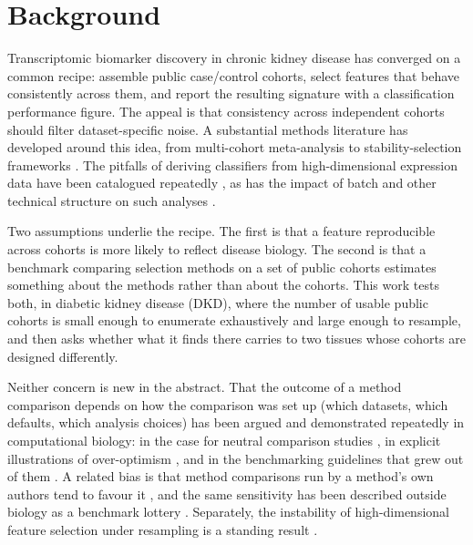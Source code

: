 \documentclass[pdflatex,sn-vancouver-num]{sn-jnl}
\theoremstyle{thmstyleone}
\theoremstyle{thmstyletwo}
\theoremstyle{thmstylethree}
\begin{document}

\maketitle

\section{Background}\label{sec:background}

Transcriptomic biomarker discovery in chronic kidney disease has converged on a common recipe:
assemble public case/control cohorts, select features that behave consistently across them, and
report the resulting signature with a classification performance figure. The appeal is that
consistency across independent cohorts should filter dataset-specific noise. A substantial
methods literature has developed around this idea, from multi-cohort meta-analysis
\cite{haynes2017} to stability-selection frameworks \cite{meinshausen2010}. The pitfalls of
deriving classifiers from high-dimensional expression data have been catalogued repeatedly
\cite{simon2003,whalen2022,diazuriarte2022}, as has the impact of batch and other technical
structure on such analyses \cite{leek2010}.

Two assumptions underlie the recipe. The first is that a feature reproducible across cohorts is
more likely to reflect disease biology. The second is that a benchmark comparing selection
methods on a set of public cohorts estimates something about the methods rather than about the
cohorts. This work tests both, in diabetic kidney disease (DKD), where the number of usable
public cohorts is small enough to enumerate exhaustively and large enough to resample, and
then asks whether what it finds there carries to two tissues whose cohorts are designed
differently.

Neither concern is new in the abstract. That the outcome of a method comparison depends on how
the comparison was set up (which datasets, which defaults, which analysis choices) has been
argued and demonstrated repeatedly in computational biology: in the case for neutral comparison
studies \cite{boulesteix2013}, in explicit illustrations of over-optimism
\cite{jelizarow2010,ullmann2023}, and in the benchmarking guidelines that grew out of them
\cite{weber2019,mangul2019}. A related bias is that method comparisons run by a method's own
authors tend to favour it \cite{norel2011}, and the same sensitivity has been described outside
biology as a benchmark lottery \cite{dehghani2021}. Separately, the instability of
high-dimensional feature selection under resampling is a standing result \cite{haury2011}.
\end{document}
